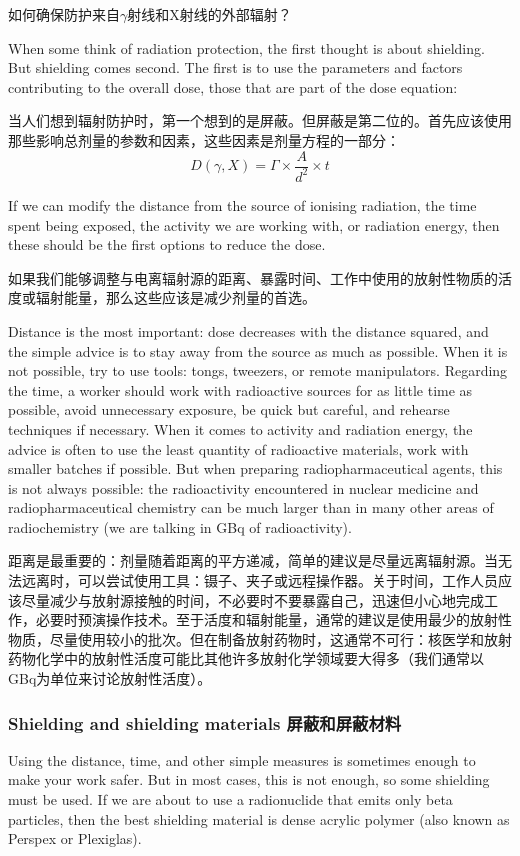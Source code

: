 \documentclass[dvipsnames, svgnames,a4paper,11pt]{article}
\begin{document}
如何确保防护来自$\gamma$射线和X射线的外部辐射？  

When some think of radiation protection, the first thought is about shielding. But shielding comes second. The first is to use the parameters and factors contributing to the overall dose, those that are part of the dose equation:

当人们想到辐射防护时，第一个想到的是屏蔽。但屏蔽是第二位的。首先应该使用那些影响总剂量的参数和因素，这些因素是剂量方程的一部分：
\[
D(\gamma, X) = \Gamma \times \frac{A}{d^{2}} \times t
\]

If we can modify the distance from the source of ionising radiation, the time spent being exposed, the activity we are working with, or radiation energy, then these should be the first options to reduce the dose.  

如果我们能够调整与电离辐射源的距离、暴露时间、工作中使用的放射性物质的活度或辐射能量，那么这些应该是减少剂量的首选。  

Distance is the most important: dose decreases with the distance squared, and the simple advice is to stay away from the source as much as possible. When it is not possible, try to use tools: tongs, tweezers, or remote manipulators. Regarding the time, a worker should work with radioactive sources for as little time as possible, avoid unnecessary exposure, be quick but careful, and rehearse techniques if necessary. When it comes to activity and radiation energy, the advice is often to use the least quantity of radioactive materials, work with smaller batches if possible. But when preparing radiopharmaceutical agents, this is not always possible: the radioactivity encountered in nuclear medicine and radiopharmaceutical chemistry can be much larger than in many other areas of radiochemistry (we are talking in GBq of radioactivity).  

距离是最重要的：剂量随着距离的平方递减，简单的建议是尽量远离辐射源。当无法远离时，可以尝试使用工具：镊子、夹子或远程操作器。关于时间，工作人员应该尽量减少与放射源接触的时间，不必要时不要暴露自己，迅速但小心地完成工作，必要时预演操作技术。至于活度和辐射能量，通常的建议是使用最少的放射性物质，尽量使用较小的批次。但在制备放射药物时，这通常不可行：核医学和放射药物化学中的放射性活度可能比其他许多放射化学领域要大得多（我们通常以GBq为单位来讨论放射性活度）。  

\subsubsection{Shielding and shielding materials 屏蔽和屏蔽材料}  
Using the distance, time, and other simple measures is sometimes enough to make your work safer. But in most cases, this is not enough, so some shielding must be used. If we are about to use a radionuclide that emits only beta particles, then the best shielding material is dense acrylic polymer (also known as Perspex or Plexiglas).
\end{document}
